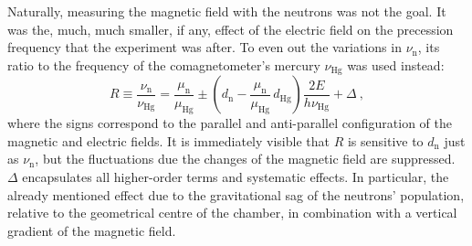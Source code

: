 Naturally, measuring the magnetic field with the neutrons was not the goal. It was the, much, much smaller, if any, effect of the electric field on the precession frequency that the experiment was after. To even out the variations in $\nu_\text{n}$, its ratio to the frequency of the comagnetometer's mercury $\nu_\text{Hg}$ was used instead:
\begin{equation}
  \label{eq:Rdefinition}
  R \equiv \frac{\nu_\text{n}}{\nu_\text{Hg}} = \frac{\mu_\text{n}}{\mu_\text{Hg}} \pm \left( d_\text{n} - \frac{\mu_\text{n}}{\mu_\text{Hg}} \, d_\text{Hg} \right) \frac{2 E}{ h  \nu_\text{Hg}} + \Delta \ ,
\end{equation}
where the signs correspond to the parallel and anti-parallel configuration of the magnetic and electric fields. It is immediately visible that $R$ is sensitive to $d_\text{n}$ just as $\nu_\text{n}$, but the fluctuations due the changes of the magnetic field are suppressed. 
$\Delta$ encapsulates all higher-order terms and systematic effects. In particular, the already mentioned effect due to the gravitational sag of the neutrons' population, relative to the geometrical centre of the chamber, in combination with a vertical gradient of the magnetic field.


